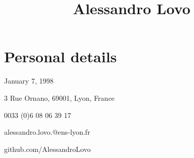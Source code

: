 \documentclass[11pt, a4 paper]{article}
\begin{document}
\title{Alessandro Lovo}
\date{}
\author{}
\maketitle


\section*{Personal details}
  \begin{multicols}{2}
    \begin{description}[style=multiline,leftmargin=2cm,align=right]
      \item[birth] January 7, 1998
      \item[address] 3 Rue Ornano, 69001, Lyon, France
      \item[phone] 0033 (0)6 08 06 39 17
      \item[e-mail]
        alessandro.lovo.@ens-lyon.fr

      \item[GitHub] github.com/AlessandroLovo
    \end{description}
  \end{multicols}
\end{document}
